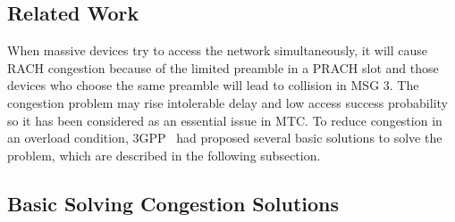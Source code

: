     \subsection{Related Work}
    \label{Related Work}
    When massive devices try to access the network simultaneously, it will cause RACH congestion because of the limited preamble in a PRACH slot and those devices who choose the same preamble will lead to collision in MSG 3. The congestion problem may rise intolerable delay and low access success probability so it has been considered as an essential issue in MTC. To reduce congestion in an overload condition, 3GPP~\cite{3GPP37.868} had proposed several basic solutions to solve the problem, which are described in the following subsection.
    \subsection{Basic Solving Congestion Solutions}
